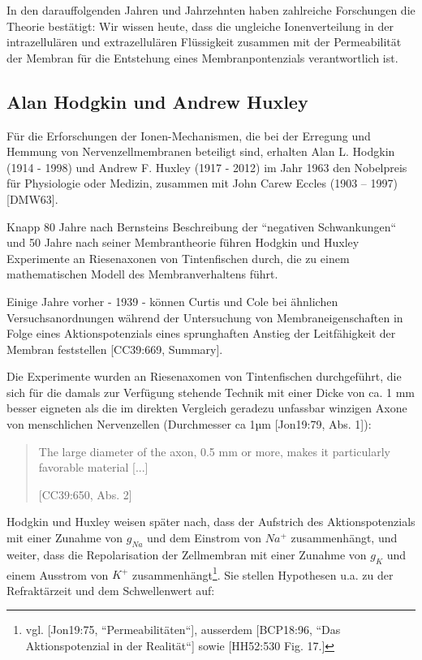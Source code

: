 In den darauffolgenden Jahren und Jahrzehnten haben zahlreiche Forschungen die Theorie bestätigt: Wir wissen heute, dass die ungleiche Ionenverteilung in der intrazellulären und extrazellulären Flüssigkeit zusammen mit der Permeabilität der Membran für die Entstehung eines Membranpontenzials verantwortlich ist.

\subsection{Alan Hodgkin und Andrew Huxley}\label{appendix:hodgkinhuxley}

Für die Erforschungen der Ionen-Mechanismen, die bei der Erregung und Hemmung von Nervenzellmembranen beteiligt sind, erhalten Alan L. Hodgkin (1914 - 1998) und Andrew F. Huxley (1917 - 2012) im Jahr 1963 den Nobelpreis für Physiologie oder Medizin, zusammen mit John Carew Eccles (1903 – 1997) {[DMW63]}.

Knapp 80 Jahre nach Bernsteins Beschreibung der ``negativen Schwankungen`` und 50 Jahre nach seiner Membrantheorie führen Hodgkin und Huxley Experimente an Riesenaxonen von Tintenfischen durch, die zu einem mathematischen Modell des Membranverhaltens führt.

Einige Jahre vorher - 1939 - können Curtis und Cole bei ähnlichen Versuchsanordnungen während der Untersuchung von Membraneigenschaften in Folge eines Aktionspotenzials eines sprunghaften Anstieg der Leitfähigkeit der Membran feststellen [CC39:669, Summary].

Die Experimente wurden an Riesenaxomen von Tintenfischen durchgeführt, die sich für die damals zur Verfügung stehende Technik mit einer Dicke von ca. 1 mm besser eigneten als die im direkten Vergleich geradezu unfassbar winzigen Axone von menschlichen Nervenzellen (Durchmesser ca 1µm {[Jon19:79, Abs. 1]}):

\blockquote[{[CC39:650, Abs. 2]}]{
    The large diameter of the axon, 0.5 mm or more, makes it particularly favorable material {[...]}
}

Hodgkin und Huxley weisen später nach, dass der Aufstrich des Aktionspotenzials mit einer Zunahme von $g_{Na}$ und dem Einstrom von $Na^+$ zusammenhängt, und weiter, dass die Repolarisation der Zellmembran mit einer Zunahme von $g_K$ und einem Ausstrom von $K^+$ zusammenhängt\footnote{
    vgl. {[Jon19:75, ``Permeabilitäten``]}, ausserdem {[BCP18:96, ``Das Aktionspotenzial in der Realität``]} sowie {[HH52:530 Fig. 17.]}
}.
Sie stellen Hypothesen u.a. zu der Refraktärzeit und dem Schwellenwert auf:\\

